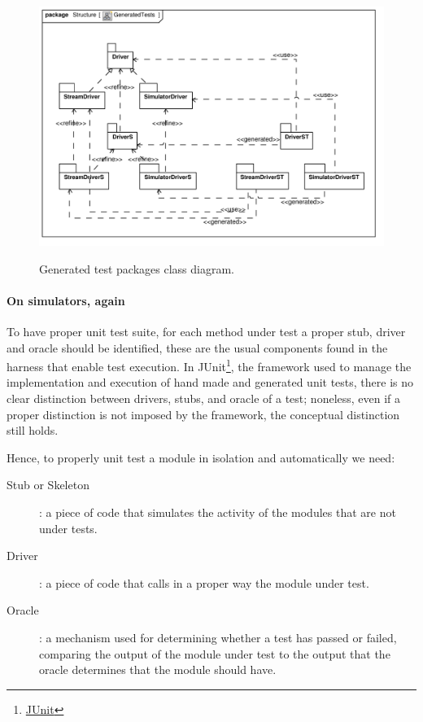 \documentclass{article} \usepackage{times}
\newcommand{\myhref}[2]{\ifpdf\href{#1}{#2}\else\htmladdnormallinkfoot{#2}{#1}\fi}
\begin{document}
\begin{figure}[htb!]
 \centering
 \includegraphics[scale=0.7]{UML_model/Class_Diagram__Structure__GeneratedTests}
 \label{fig:class_diagram_generatedtest}
 \caption{Generated test packages class diagram.}
\end{figure}

\paragraph*{On simulators, again}

To have proper unit test suite, for each method under test a proper stub, 
driver and oracle should be identified, these are the usual components found 
in the harness that enable test execution\cite{binder1999testing}.
In JUnit\footnote{\myhref{http://www.junit.org/}{JUnit}}, the framework used 
to manage the implementation and execution of hand made and generated unit 
tests, there is no clear distinction between drivers, stubs, and oracle of a 
test; noneless, even if a proper distinction is not imposed by the framework, 
the conceptual distinction still holds.

Hence, to properly unit test a module in isolation and automatically we need:

\begin{description}
 \item[Stub or Skeleton]: a piece of code that simulates the activity of 
the modules that are not under tests.
 \item[Driver]: a piece of code that calls in a proper way the module under 
test.
 \item[Oracle]: a mechanism used for determining whether a test has passed 
or failed, comparing the output of the module under test to the output that 
the oracle determines that the module should have.
\end{description} 
\end{document}
